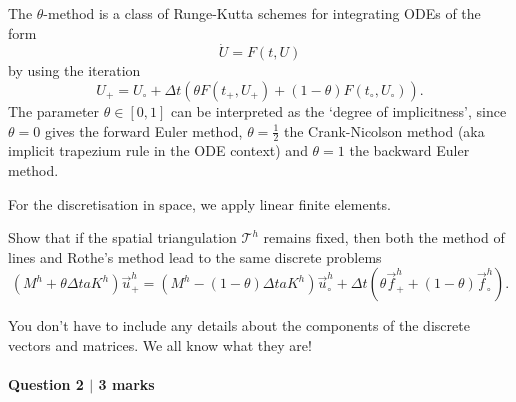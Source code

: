 \documentclass[10pt,letterpaper]{scrartcl}
\begin{document}
The $\theta$-method is a class of Runge-Kutta schemes for integrating ODEs of the form
\begin{equation*}
\dot{U} = F(t,U)
\end{equation*}
by using the iteration
\begin{equation*}
U_+ = U_\circ + \Delta t \left( \theta F(t_+,U_+) + (1-\theta) F(t_\circ,U_\circ) \right).
\end{equation*}
The parameter $\theta \in [0,1]$ can be interpreted as the `degree of implicitness', since $\theta = 0$ gives the forward Euler method, $\theta = \frac{1}{2}$ the Crank-Nicolson method (aka implicit trapezium rule in the ODE context) and $\theta = 1$ the backward Euler method.

For the discretisation in space, we apply linear finite elements.

Show that if the spatial triangulation $\mathcal{T}^h$ remains fixed, then both the method of lines and Rothe's method lead to the same discrete problems
\begin{equation*}
\left( M^h + \theta \Delta t a K^h\right) \vec{u}^h_+ = \left( M^h - (1-\theta)\Delta t a K^h\right) \vec{u}^h_\circ + \Delta t \left( \theta \vec{f}^h_+ + (1-\theta) \vec{f}^h_\circ \right).
\end{equation*}

You don't have to include any details about the components of the discrete vectors and matrices. We all know what they are!

\newpage

\mbox{}

\vspace{11cm}

\paragraph*{Question 2 $\vert$ 3 marks}
\end{document}
